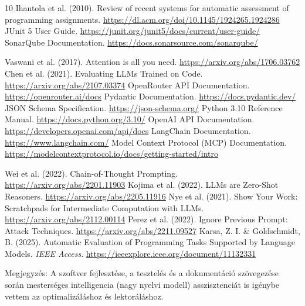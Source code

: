 \documentclass[12pt,a4paper]{article}
\begin{document}
\begin{thebibliography}{10}
 Ihantola et al. (2010). Review of recent systems for automatic assessment of programming assignments. \url{https://dl.acm.org/doi/10.1145/1924265.1924286}
 JUnit 5 User Guide. \url{https://junit.org/junit5/docs/current/user-guide/}
 SonarQube Documentation. \url{https://docs.sonarsource.com/sonarqube/}

 Vaswani et al. (2017). Attention is all you need. \url{https://arxiv.org/abs/1706.03762}
 Chen et al. (2021). Evaluating LLMs Trained on Code. \url{https://arxiv.org/abs/2107.03374}
 OpenRouter API Documentation. \url{https://openrouter.ai/docs}
 Pydantic Documentation. \url{https://docs.pydantic.dev/}
 JSON Schema Specification. \url{https://json-schema.org/}
 Python 3.10 Reference Manual. \url{https://docs.python.org/3.10/}
 OpenAI API Documentation. \url{https://developers.openai.com/api/docs}
 LangChain Documentation. \url{https://www.langchain.com/}
 Model Context Protocol (MCP) Documentation. \url{https://modelcontextprotocol.io/docs/getting-started/intro}

 Wei et al. (2022). Chain-of-Thought Prompting. \url{https://arxiv.org/abs/2201.11903}
 Kojima et al. (2022). LLMs are Zero-Shot Reasoners. \url{https://arxiv.org/abs/2205.11916}
 Nye et al. (2021). Show Your Work: Scratchpads for Intermediate Computation with LLMs. \url{https://arxiv.org/abs/2112.00114}
 Perez et al. (2022). Ignore Previous Prompt: Attack Techniques. \url{https://arxiv.org/abs/2211.09527}
 Karsa, Z. I. \& Goldschmidt, B. (2025). Automatic Evaluation of Programming Tasks Supported by Language Models. \textit{IEEE Access}. \url{https://ieeexplore.ieee.org/document/11132331}

 Megjegyzés: A szoftver fejlesztése, a tesztelés és a dokumentáció szövegezése során mesterséges intelligencia (nagy nyelvi modell) asszisztenciát is igénybe vettem az optimalizáláshoz és lektoráláshoz.
\end{thebibliography}
\end{document}
